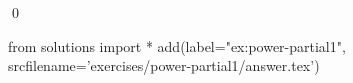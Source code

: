 
\begin{ex} 
  \label{ex:power-partial1}
  
  \qed
\end{ex} 
\begin{python0}
from solutions import *
add(label="ex:power-partial1",
    srcfilename='exercises/power-partial1/answer.tex') 
\end{python0}
